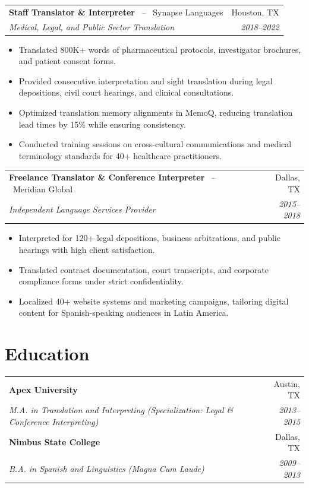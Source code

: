 \documentclass[10pt,letterpaper]{article}
\begin{document}
\begin{tabularx}{\textwidth}{@{} X r @{}}
  \textbf{\color{primaryColor}Staff Translator \& Interpreter} \ -- \ Synapse Languages & Houston, TX \\
  \textit{Medical, Legal, and Public Sector Translation} & \textit{2018--2022} \\
\end{tabularx}
\begin{itemize}
  \item Translated 800K+ words of pharmaceutical protocols, investigator brochures, and patient consent forms.
  \item Provided consecutive interpretation and sight translation during legal depositions, civil court hearings, and clinical consultations.
  \item Optimized translation memory alignments in MemoQ, reducing translation lead times by 15\% while ensuring consistency.
  \item Conducted training sessions on cross-cultural communications and medical terminology standards for 40+ healthcare practitioners.
\end{itemize}

\vspace{6pt}

\begin{tabularx}{\textwidth}{@{} X r @{}}
  \textbf{\color{primaryColor}Freelance Translator \& Conference Interpreter} \ -- \ Meridian Global & Dallas, TX \\
  \textit{Independent Language Services Provider} & \textit{2015--2018} \\
\end{tabularx}
\begin{itemize}
  \item Interpreted for 120+ legal depositions, business arbitrations, and public hearings with high client satisfaction.
  \item Translated contract documentation, court transcripts, and corporate compliance forms under strict confidentiality.
  \item Localized 40+ website systems and marketing campaigns, tailoring digital content for Spanish-speaking audiences in Latin America.
\end{itemize}

\section*{Education}
\begin{tabularx}{\textwidth}{@{} X r @{}}
  \textbf{Apex University} & Austin, TX \\
  \textit{M.A. in Translation and Interpreting (Specialization: Legal \& Conference Interpreting)} & \textit{2013--2015} \\
  \addlinespace
  \textbf{Nimbus State College} & Dallas, TX \\
  \textit{B.A. in Spanish and Linguistics (Magna Cum Laude)} & \textit{2009--2013} \\
\end{tabularx}
\end{document}
